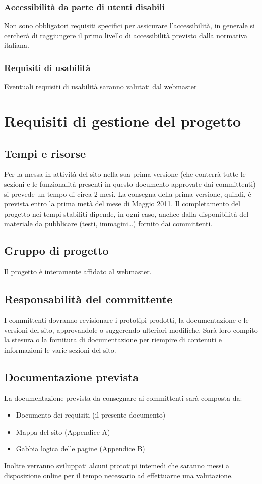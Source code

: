 \documentclass[a4paper]{report}	%
\begin{document}
\subsection{Accessibilità da parte di utenti disabili}
Non sono obbligatori requisiti specifici per assicurare l'accessibilità, in generale si cercherà di raggiungere il primo livello di accessibilità previsto dalla normativa italiana.
\subsection{Requisiti di usabilità}
Eventuali requisiti di usabilità saranno valutati dal webmaster

\chapter{Requisiti di gestione del progetto}
\section{Tempi e risorse}
Per la messa in attività del sito nella sua prima versione (che conterrà tutte le sezioni e le funzionalità presenti in questo documento approvate dai committenti) si prevede un tempo di circa 2 mesi. La consegna della prima versione, quindi, è prevista entro la prima metà del mese di Maggio 2011.
Il completamento del progetto nei tempi stabiliti dipende, in ogni caso, anchce dalla disponibilità del materiale da pubblicare (testi, immagini\ldots) fornito dai committenti.

\section{Gruppo di progetto}
Il progetto è interamente affidato al webmaster.
\section{Responsabilità del committente}
I committenti dovranno revisionare i prototipi prodotti, la documentazione e le versioni del sito, approvandole o suggerendo ulteriori modifiche. Sarà loro compito la stesura o la fornitura di documentazione per riempire di contenuti e informazioni le varie sezioni del sito.
\section{Documentazione prevista}
La documentazione prevista da consegnare ai committenti sarà composta da:
\begin{itemize}
\item Documento dei requisiti (il presente documento)
\item Mappa del sito (Appendice A)
\item Gabbia logica delle pagine (Appendice B)
\end{itemize}
Inoltre verranno sviluppati alcuni prototipi intemedi che saranno messi a disposizione online per il tempo necessario ad effettuarne una valutazione. 
\end{document}
